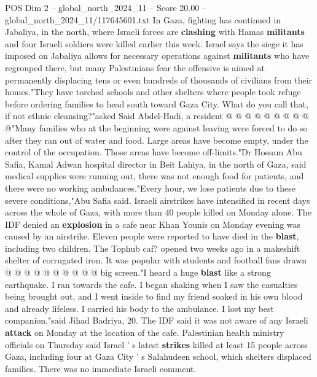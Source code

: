 \begin{textsample}{POS Dim 2 – global\_north\_2024\_11 – Score 20.00 – global\_north\_2024\_11/117645601.txt}
In Gaza, fighting has continued in Jabaliya, in the north, where Israeli forces are \textbf{clashing} with Hamas \textbf{militants} and four Israeli soldiers were killed earlier this week.
Israel says the siege it has imposed on Jabaliya allows for necessary operations against \textbf{militants} who have regrouped there, but many Palestinians fear the offensive is aimed at permanently displacing tens or even hundreds of thousands of civilians from their homes."They have torched schools and other shelters where people took refuge before ordering families to head south toward Gaza City.
What do you call that, if not ethnic cleansing?"asked Said Abdel-Hadi, a resident @ @ @ @ @ @ @ @ @ @"Many families who at the beginning were against leaving were forced to do so after they ran out of water and food.
Large areas have become empty, under the control of the occupation.
Those areas have become off-limits."Dr Hossam Abu Safia, Kamal Adwan hospital director in Beit Lahiya, in the north of Gaza, said medical supplies were running out, there was not enough food for patients, and there were no working ambulances."Every hour, we lose patients due to these severe conditions,"Abu Safia said.
Israeli airstrikes have intensified in recent days across the whole of Gaza, with more than 40 people killed on Monday alone.
The IDF denied an \textbf{explosion} in a cafe near Khan Younis on Monday evening was caused by an airstrike.
Eleven people were reported to have died in the \textbf{blast}, including two children.
The Tophub caf? opened two weeks ago in a makeshift shelter of corrugated iron.
It was popular with students and football fans drawn @ @ @ @ @ @ @ @ @ @ big screen."I heard a huge \textbf{blast} like a strong earthquake.
I ran towards the cafe.
I began shaking when I saw the casualties being brought out, and I went inside to find my friend soaked in his own blood and already lifeless.
I carried his body to the ambulance.
I lost my best companion,"said Jihad Badriya, 20.
The IDF said it was not aware of any Israeli \textbf{attack} on Monday at the location of the cafe.
Palestinian health ministry officials on Thursday said Israel ' s latest \textbf{strikes} killed at least 15 people across Gaza, including four at Gaza City ' s Salahudeen school, which shelters displaced families.
There was no immediate Israeli comment.

\end{textsample}
